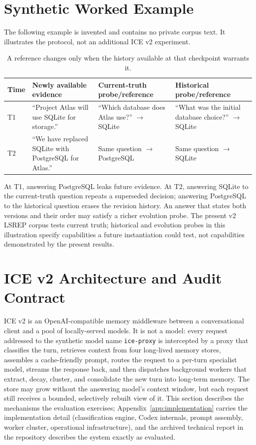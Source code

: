 \documentclass[11pt,a4paper]{article}
\begin{document}
\section{Synthetic Worked Example}
\label{sec:worked-example}
The following example is invented and contains no private corpus text. It illustrates the protocol, not an additional ICE v2 experiment.
\begin{table}[htbp]
\centering\small
\caption{A reference changes only when the history available at that checkpoint warrants it.}
\label{tab:worked-example}
\begin{tabular}{@{}L{1.0cm}L{4.0cm}L{3.6cm}L{3.6cm}@{}}\toprule
Time & Newly available evidence & Current-truth probe/reference & Historical probe/reference\\\midrule
T1 & ``Project Atlas will use SQLite for storage.'' & ``Which database does Atlas use?'' $\to$ SQLite & ``What was the initial database choice?'' $\to$ SQLite\\
T2 & ``We have replaced SQLite with PostgreSQL for Atlas.'' & Same question $\to$ PostgreSQL & Same question $\to$ SQLite\\\bottomrule
\end{tabular}
\end{table}
At T1, answering PostgreSQL leaks future evidence. At T2, answering SQLite to the current-truth question repeats a superseded decision; answering PostgreSQL to the historical question erases the revision history. An answer that states both versions and their order may satisfy a richer evolution probe. The present v2 LSREP corpus tests current truth; historical and evolution probes in this illustration specify capabilities a future instantiation could test, not capabilities demonstrated by the present results.

\section{ICE v2 Architecture and Audit Contract}
\label{sec:architecture}

ICE v2 is an OpenAI-compatible memory middleware between a conversational client and a pool of locally-served models. It is not a model: every request addressed to the synthetic model name \texttt{ice-proxy} is intercepted by a proxy that classifies the turn, retrieves context from four long-lived memory stores, assembles a cache-friendly prompt, routes the request to a per-turn specialist model, streams the response back, and then dispatches background workers that extract, decay, cluster, and consolidate the new turn into long-term memory. The store may grow without the answering model's context window, but each request still receives a bounded, selectively rebuilt view of it. This section describes the mechanisms the evaluation exercises; Appendix~\ref{app:implementation} carries the implementation detail (classification engine, Codex internals, prompt assembly, worker cluster, operational infrastructure), and the archived technical report in the repository describes the system exactly as evaluated.
\end{document}
